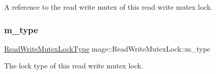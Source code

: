 A reference to the read write mutex of this read write mutex lock. \hypertarget{structmage_1_1_read_write_mutex_lock_aa117ffe94f6850ddc91ad6d1389fb6e2}{}\label{structmage_1_1_read_write_mutex_lock_aa117ffe94f6850ddc91ad6d1389fb6e2} 
\subsubsection{\texorpdfstring{m\+\_\+type}{m\_type}}
{\footnotesize\ttfamily \hyperlink{namespacemage_afd76fcca37ce5c5b2227671290973c74}{Read\+Write\+Mutex\+Lock\+Type} mage\+::\+Read\+Write\+Mutex\+Lock\+::m\+\_\+type\hspace{0.3cm}{\ttfamily [private]}}

The lock type of this read write mutex lock. 